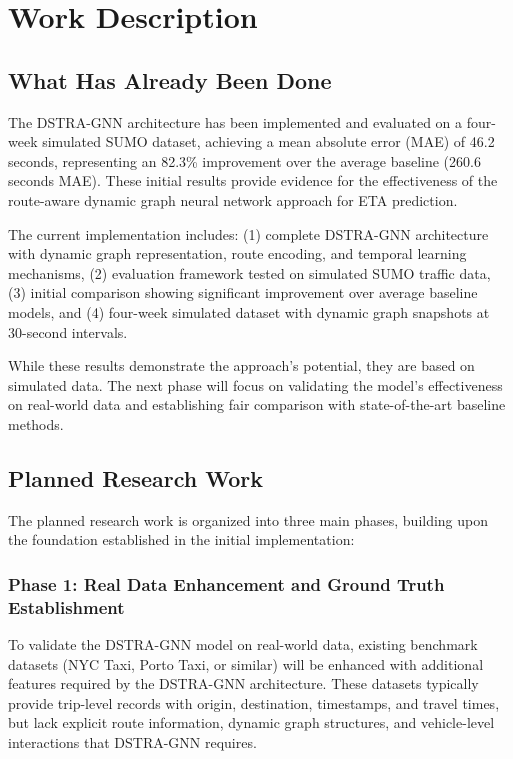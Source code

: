 \section{Work Description}

\subsection{What Has Already Been Done}

The DSTRA-GNN architecture has been implemented and evaluated on a four-week simulated SUMO dataset, achieving a mean absolute error (MAE) of 46.2 seconds, representing an 82.3\% improvement over the average baseline (260.6 seconds MAE). These initial results provide evidence for the effectiveness of the route-aware dynamic graph neural network approach for ETA prediction.

The current implementation includes: (1) complete DSTRA-GNN architecture with dynamic graph representation, route encoding, and temporal learning mechanisms, (2) evaluation framework tested on simulated SUMO traffic data, (3) initial comparison showing significant improvement over average baseline models, and (4) four-week simulated dataset with dynamic graph snapshots at 30-second intervals.

While these results demonstrate the approach's potential, they are based on simulated data. The next phase will focus on validating the model's effectiveness on real-world data and establishing fair comparison with state-of-the-art baseline methods.

\subsection{Planned Research Work}

The planned research work is organized into three main phases, building upon the foundation established in the initial implementation:

\subsubsection{Phase 1: Real Data Enhancement and Ground Truth Establishment}

To validate the DSTRA-GNN model on real-world data, existing benchmark datasets (NYC Taxi, Porto Taxi, or similar) will be enhanced with additional features required by the DSTRA-GNN architecture. These datasets typically provide trip-level records with origin, destination, timestamps, and travel times, but lack explicit route information, dynamic graph structures, and vehicle-level interactions that DSTRA-GNN requires.

